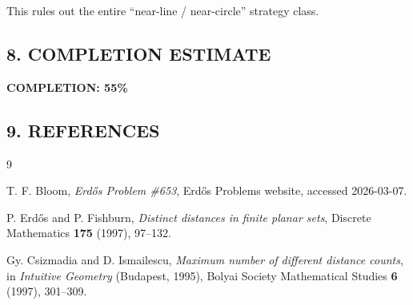 This rules out the entire ``near-line / near-circle'' strategy class.

\subsection*{8. COMPLETION ESTIMATE}

\textbf{COMPLETION: 55\%}

\subsection*{9. REFERENCES}

\begin{thebibliography}{9}

T. F. Bloom,
\emph{Erd\H{o}s Problem \#653},
Erd\H{o}s Problems website, accessed 2026-03-07.

P. Erd\H{o}s and P. Fishburn,
\emph{Distinct distances in finite planar sets},
Discrete Mathematics \textbf{175} (1997), 97--132.

Gy. Csizmadia and D. Ismailescu,
\emph{Maximum number of different distance counts},
in \emph{Intuitive Geometry} (Budapest, 1995),
Bolyai Society Mathematical Studies \textbf{6} (1997), 301--309.

\end{thebibliography}
